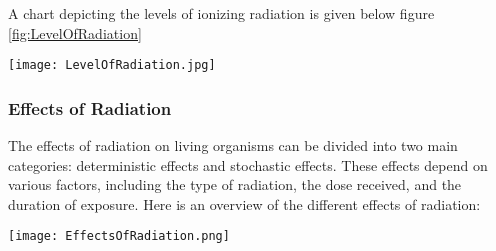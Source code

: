 \documentclass[../../Report.tex]{subfiles}
\begin{document}
        A chart depicting the levels of ionizing radiation is given below figure \ref{fig:LevelOfRadiation}
        \begin{Figure}
            \centering
            \texttt{[image: LevelOfRadiation.jpg]}
            \label{fig:LevelOfRadiation}
        \end{Figure}


    \subsubsection*{\large Effects of Radiation}

        The effects of radiation on living organisms can be divided into two main categories: deterministic effects and 
        stochastic effects. These effects depend on various factors, including the type of radiation, the dose received, 
        and the duration of exposure. Here is an overview of the different effects of radiation:

        \begin{Figure}
            \centering
            \texttt{[image: EffectsOfRadiation.png]}
            \label{fig:EffectsOfRadiation}
        \end{Figure}
\end{document}
